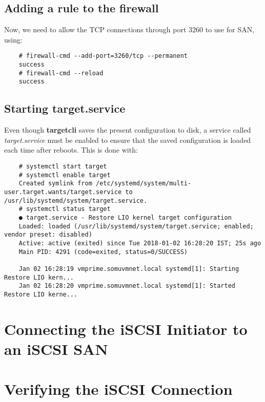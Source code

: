 
\usepackage{minted}
\usepackage{booktabs}


	
	
	\subsection{Adding a rule to the firewall}
	Now, we need to allow the TCP connections through port 3260 to use for SAN, using:
	
	\vspace{-15pt}
	\begin{verbatim}
	# firewall-cmd --add-port=3260/tcp --permanent 
	success
	# firewall-cmd --reload
	success
	\end{verbatim}
	\vspace{-10pt}
	
	\subsection{Starting target.service}
	Even though \textbf{targetcli} saves the present configuration to disk, a service called \textit{target.service} must be enabled to ensure that the saved configuration is loaded each time after reboots. This is done with:
	
	\vspace{-15pt}
	\begin{verbatim}
	# systemctl start target
	# systemctl enable target
	Created symlink from /etc/systemd/system/multi-user.target.wants/target.service to /usr/lib/systemd/system/target.service.
	# systemctl status target
	● target.service - Restore LIO kernel target configuration
	Loaded: loaded (/usr/lib/systemd/system/target.service; enabled; vendor preset: disabled)
	Active: active (exited) since Tue 2018-01-02 16:28:20 IST; 25s ago
	Main PID: 4291 (code=exited, status=0/SUCCESS)
	
	Jan 02 16:28:19 vmprime.somuvmnet.local systemd[1]: Starting Restore LIO kern...
	Jan 02 16:28:20 vmprime.somuvmnet.local systemd[1]: Started Restore LIO kerne...
	\end{verbatim}
	\vspace{-10pt}
	
	\noindent
	
	
	\section{Connecting the iSCSI Initiator to an iSCSI SAN}
	\section{Verifying the iSCSI Connection}	
	



